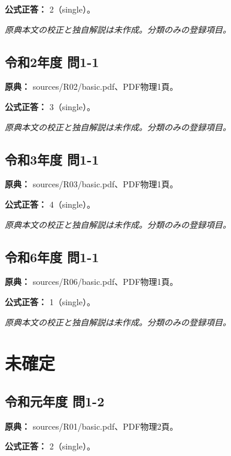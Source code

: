 \textbf{公式正答：} 2（single）。

\par\textit{原典本文の校正と独自解説は未作成。分類のみの登録項目。}

\subsection{令和2年度 問1-1}
\label{q:r02-reg-basic-1-1}

\noindent\textbf{原典：} sources/R02/basic.pdf、PDF物理1頁。

\textbf{公式正答：} 3（single）。

\par\textit{原典本文の校正と独自解説は未作成。分類のみの登録項目。}

\subsection{令和3年度 問1-1}
\label{q:r03-reg-basic-1-1}

\noindent\textbf{原典：} sources/R03/basic.pdf、PDF物理1頁。

\textbf{公式正答：} 4（single）。

\par\textit{原典本文の校正と独自解説は未作成。分類のみの登録項目。}

\subsection{令和6年度 問1-1}
\label{q:r06-reg-basic-1-1}

\noindent\textbf{原典：} sources/R06/basic.pdf、PDF物理1頁。

\textbf{公式正答：} 1（single）。

\par\textit{原典本文の校正と独自解説は未作成。分類のみの登録項目。}

\section{未確定}

\subsection{令和元年度 問1-2}
\label{q:r01-reg-basic-1-2}

\noindent\textbf{原典：} sources/R01/basic.pdf、PDF物理2頁。

\textbf{公式正答：} 2（single）。

